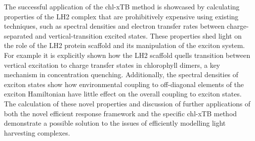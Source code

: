 \begin{SingleSpace}
The successful application of the chl-xTB method is showcased by calculating properties 
of the LH2 complex that are prohibitively expensive using existing techniques, such 
as spectral densities and electron transfer rates between charge-separated and vertical-transition
excited states. These properties shed light on the role of the LH2 protein scaffold 
and its manipulation of the exciton system. For example it is explicitly shown how
the LH2 scaffold quells transition between vertical excitation to charge transfer 
states in chlorophyll dimers, a key mechanism in concentration quenching. Additionally,
the spectral densities of exciton states show how environmental coupling to off-diagonal
elements of the exciton Hamiltonian have little effect on the overall coupling to 
exciton states. The calculation of these novel properties and discussion of further
applications of both the novel efficient response framework and the specific chl-xTB 
method demonstrate a possible solution to the issues of efficiently modelling light
harvesting complexes.

\end{SingleSpace}
\clearpage